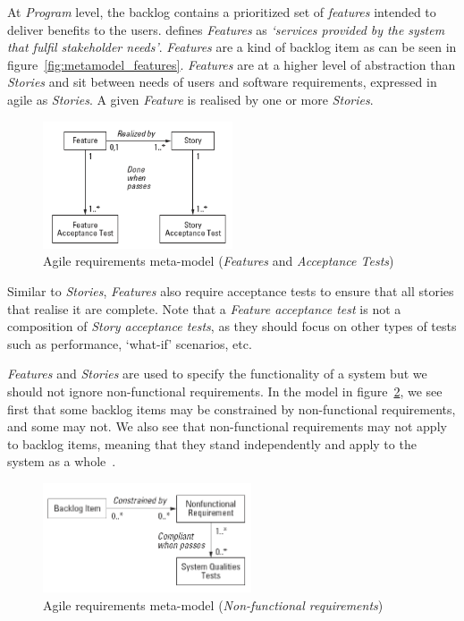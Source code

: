 \documentclass[dissertation,final]{softeng}
\begin{document}
At \emph{Program} level, the backlog contains a prioritized set of \emph{features} intended to deliver benefits to the users. \citet{Leffingwell2011} defines \emph{Features} as \emph{`services provided by the system that fulfil stakeholder needs'}. \emph{Features} are a kind of backlog item as can be seen in figure~\ref{fig:metamodel_features}. \emph{Features} are at a higher level of abstraction than \emph{Stories} and sit between needs of users and software requirements, expressed in agile as \emph{Stories}. A given \emph{Feature} is realised by one or more \emph{Stories}.

\begin{figure}[h]
\includegraphics[width=0.50\textwidth]{metamodel_features_tests}
\centering
\caption{Agile requirements meta-model (\emph{Features} and \emph{Acceptance Tests})}
\label{fig:metamodel_features_tests}
\end{figure}

Similar to \emph{Stories}, \emph{Features} also require acceptance tests to ensure that all stories that realise it are complete. Note that a \emph{Feature acceptance test} is not a composition of \emph{Story acceptance tests}, as they should focus on other types of tests such as performance, `what-if' scenarios, etc. 

\emph{Features} and \emph{Stories} are used to specify the functionality of a system but we should not ignore non-functional requirements. In the model in figure~\ref{fig:metamodel_nfrs}, we see first that some backlog items may be constrained by non-functional requirements, and some may not. We also see that non-functional requirements may not apply to backlog items, meaning that they stand independently and apply to the system as a whole~\citep{Leffingwell2011}.

\begin{figure}[h]
\includegraphics[width=0.55\textwidth]{metamodel_nfrs}
\centering
\caption{Agile requirements meta-model (\emph{Non-functional requirements})}
\label{fig:metamodel_nfrs}
\end{figure}
\end{document}
